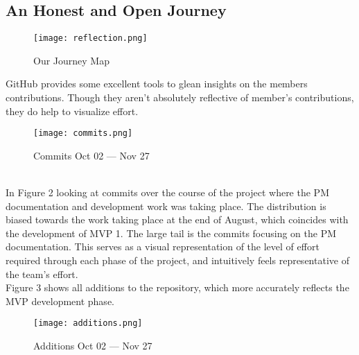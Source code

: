 \documentclass[english,course]{lecture}
\begin{document}
\subsection*{An Honest and Open Journey}
\begin{figure}[H]
  \centering
  \texttt{[image: reflection.png]}
  \caption{Our Journey Map}\label{OurJourneyMap}
\end{figure}
%
GitHub provides some excellent tools to glean insights on the members contributions. Though they aren't absolutely reflective of member's contributions, they do help to visualize effort.
%
\begin{figure}[H]
  \centering
  \texttt{[image: commits.png]}
  \caption{Commits Oct 02 --- Nov 27}\label{Commits}
\end{figure}
%
\\In Figure 2 looking at commits over the course of the project where the PM documentation and development work was taking place. The distribution is biased towards the work taking place at the end of August, which coincides with the development of MVP 1. The large tail is the commits focusing on the PM documentation. This serves as a visual representation of the level of effort required through each phase of the project, and intuitively feels representative of the team's effort.
%
\\ Figure 3 shows all additions to the repository, which more accurately reflects the MVP development phase.
%
\begin{figure}[H]
  \centering
  \texttt{[image: additions.png]}
  \caption{Additions Oct 02 --- Nov 27}\label{Additions}
\end{figure}
%
\end{document}
